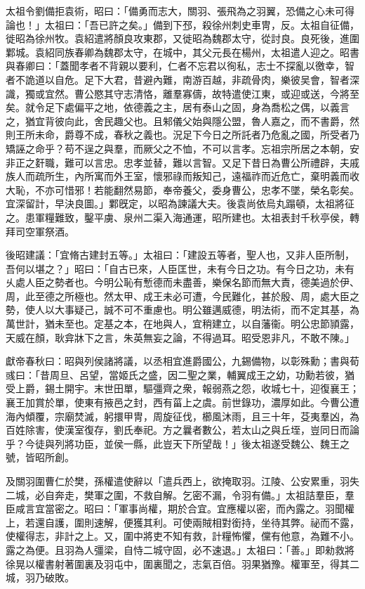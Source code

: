 \begin{pinyinscope}
太祖令劉備拒袁術，昭曰：「備勇而志大，關羽、張飛為之羽翼，恐備之心未可得論也！」太祖曰：「吾已許之矣。」備到下邳，殺徐州刺史車冑，反。太祖自征備，徙昭為徐州牧。袁紹遣將顏良攻東郡，又徙昭為魏郡太守，從討良。良死後，進圍鄴城。袁紹同族春卿為魏郡太守，在城中，其父元長在楊州，太祖遣人迎之。昭書與春卿曰：「蓋聞孝者不背親以要利，仁者不忘君以徇私，志士不探亂以徼幸，智者不詭道以自危。足下大君，昔避內難，南游百越，非疏骨肉，樂彼吴會，智者深識，獨或宜然。曹公愍其守志清恪，離羣寡儔，故特遣使江東，或迎或送，今將至矣。就令足下處偏平之地，依德義之主，居有泰山之固，身為喬松之偶，以義言之，猶宜背彼向此，舍民趣父也。且邾儀父始與隱公盟，魯人嘉之，而不書爵，然則王所未命，爵尊不成，春秋之義也。況足下今日之所託者乃危亂之國，所受者乃矯誣之命乎？苟不逞之與羣，而厥父之不恤，不可以言孝。忘祖宗所居之本朝，安非正之姧職，難可以言忠。忠孝並替，難以言智。又足下昔日為曹公所禮辟，夫戚族人而疏所生，內所寓而外王室，懷邪祿而叛知己，遠福祚而近危亡，棄明義而收大恥，不亦可惜邪！若能翻然易節，奉帝養父，委身曹公，忠孝不墜，榮名彰矣。宜深留計，早決良圖。」鄴旣定，以昭為諫議大夫。後袁尚依烏丸蹋頓，太祖將征之。患軍糧難致，鑿平虜、泉州二渠入海通運，昭所建也。太祖表封千秋亭侯，轉拜司空軍祭酒。

後昭建議：「宜脩古建封五等。」太祖曰：「建設五等者，聖人也，又非人臣所制，吾何以堪之？」昭曰：「自古已來，人臣匡世，未有今日之功。有今日之功，未有乆處人臣之勢者也。今明公恥有慙德而未盡善，樂保名節而無大責，德美過於伊、周，此至德之所極也。然太甲、成王未必可遭，今民難化，甚於殷、周，處大臣之勢，使人以大事疑己，誠不可不重慮也。明公雖邁威德，明法術，而不定其基，為萬世計，猶未至也。定基之本，在地與人，宜稍建立，以自藩衞。明公忠節頴露，天威在顏，耿弇牀下之言，朱英無妄之論，不得過耳。昭受恩非凡，不敢不陳。」

獻帝春秋曰：昭與列侯諸將議，以丞相宜進爵國公，九錫備物，以彰殊勳；書與荀彧曰：「昔周旦、呂望，當姬氏之盛，因二聖之業，輔翼成王之幼，功勳若彼，猶受上爵，錫土開宇。末世田單，驅彊齊之衆，報弱燕之怨，收城七十，迎復襄王；襄王加賞於單，使東有掖邑之封，西有菑上之虞。前世錄功，濃厚如此。今曹公遭海內傾覆，宗廟焚滅，躬擐甲冑，周旋征伐，櫛風沐雨，且三十年，芟夷羣凶，為百姓除害，使漢室復存，劉氏奉祀。方之曩者數公，若太山之與丘垤，豈同日而論乎？今徒與列將功臣，並侯一縣，此豈天下所望哉！」後太祖遂受魏公、魏王之號，皆昭所創。

及關羽圍曹仁於樊，孫權遣使辭以「遣兵西上，欲掩取羽。江陵、公安累重，羽失二城，必自奔走，樊軍之圍，不救自解。乞密不漏，令羽有備。」太祖詰羣臣，羣臣咸言宜當密之。昭曰：「軍事尚權，期於合宜。宜應權以密，而內露之。羽聞權上，若還自護，圍則速解，便獲其利。可使兩賊相對銜持，坐待其弊。祕而不露，使權得志，非計之上。又，圍中將吏不知有救，計糧怖懼，儻有他意，為難不小。露之為便。且羽為人彊梁，自恃二城守固，必不速退。」太祖曰：「善。」即勑救將徐晃以權書射著圍裏及羽屯中，圍裏聞之，志氣百倍。羽果猶豫。權軍至，得其二城，羽乃破敗。


\end{pinyinscope}
